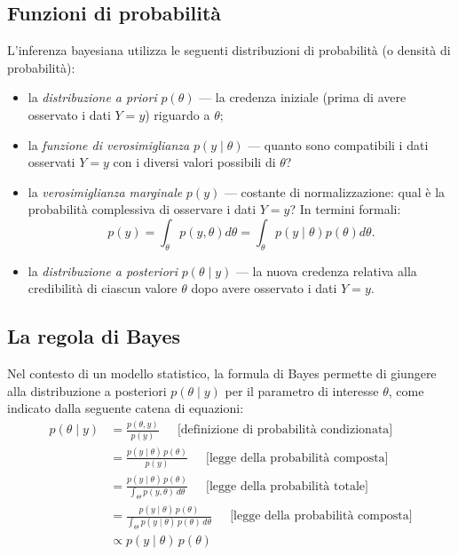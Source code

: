 \documentclass[
  11pt,
  italian,
  a4paper,
  extrafontsizes,onecolumn,openright
  ]{memoir}
\providecommand{\tightlist}{%
  \setlength{\itemsep}{0pt}\setlength{\parskip}{0pt}}
\begin{document}
\hypertarget{funzioni-di-probabilituxe0}{%
\subsection{Funzioni di probabilità}\label{funzioni-di-probabilituxe0}}

L'inferenza bayesiana utilizza le seguenti distribuzioni di probabilità (o densità di probabilità):

\begin{itemize}
\tightlist
\item
  la \emph{distribuzione a priori} \(p(\theta)\) --- la credenza iniziale (prima di avere osservato i dati \(Y = y\)) riguardo a \(\theta\);
\item
  la \emph{funzione di verosimiglianza} \(p(y \mid \theta)\) --- quanto sono compatibili i dati osservati \(Y = y\) con i diversi valori possibili di \(\theta\)?
\item
  la \emph{verosimiglianza marginale} \(p(y)\) --- costante di normalizzazione: qual è la probabilità complessiva di osservare i dati \(Y = y\)? In termini formali:
  \[
  p(y) = \int_\theta p(y, \theta) d\theta = \int_\theta p(y \mid \theta) p(\theta) d\theta.
  \]
\item
  la \emph{distribuzione a posteriori} \(p(\theta \mid y)\) --- la nuova credenza relativa alla credibilità di ciascun valore \(\theta\) dopo avere osservato i dati \(Y = y\).
\end{itemize}

\hypertarget{la-regola-di-bayes}{%
\subsection{La regola di Bayes}\label{la-regola-di-bayes}}

Nel contesto di un modello statistico, la formula di Bayes permette di giungere alla distribuzione a posteriori \(p(\theta \mid y)\) per il parametro di interesse \(\theta\), come indicato dalla seguente catena di equazioni:
\begin{align}
p(\theta \mid y)  &= \displaystyle \frac{p(\theta,y)}{p(y)}
 \ \ \ \ \ \mbox{ [definizione di probabilità condizionata]}
\\
&= \displaystyle \frac{p(y \mid \theta) \, p(\theta)}{p(y)}
 \ \ \ \ \ \mbox{ [legge della probabilità composta]}
\\
&=  \displaystyle \frac{p(y \mid\theta) \, p(\theta)}
                        {\int_{\Theta} p(y,\theta) \, d\theta}
 \ \ \ \ \ \mbox{ [legge della probabilità totale]}
\\
&= \displaystyle \frac{p(y \mid\theta) \, p(\theta)}
                        {\int_{\Theta} p(y \mid\theta) \, p(\theta) \, d\theta}
 \ \ \ \ \ \mbox{ [legge della probabilità composta]}
\\
& \propto \displaystyle p(y \mid\theta) \, p(\theta)
\label{eq:bayesmodel}
\end{align}
\end{document}
